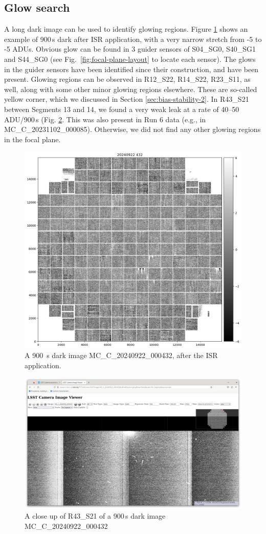 \clearpage
\subsection{Glow search}
A long dark image can be used to identify glowing regions. Figure \ref{fig:glowsearch} shows an example of 900\,s dark after ISR application, with a very narrow stretch from -5 to -5 ADUs. 
Obvious glow can be found in 3 guider sensors of S04\_SG0, S40\_SG1 and S44\_SG0 (see Fig.~\ref{fig:focal-plane-layout} to locate each sensor). The glows in the guider sensors have been identified since their construction, and have been present.
Glowing regions can be observed in R12\_S22, R14\_S22, R23\_S11, as well, along with some other minor glowing regions elsewhere. These are so-called yellow corner, which we discussed in Section \ref{sec:bias-stability-2}.
In R43\_S21 between Segments 13 and 14, we found a very weak leak at a rate of 40--50\,ADU/900\,s (Fig. \ref{fig:glowsearch:closeup}. This was also present in Run 6 data (e.g., in MC\_C\_20231102\_000085).
Otherwise, we did not find any other glowing regions in the focal plane.

\begin{figure}
    \centering
    \includegraphics[width=0.5\linewidth]{figures/glowsearch/900sdark.png}
    \caption{A 900\, s dark image MC\_C\_20240922\_000432, after the ISR application.}
    \label{fig:glowsearch}
\end{figure}
\begin{figure}
    \centering
    \includegraphics[width=1.0\linewidth]{figures/glowsearch/R43S21.png}
    \caption{A close up of R43\_S21 of a 900\,s dark image MC\_C\_20240922\_000432}
    \label{fig:glowsearch:closeup}
\end{figure}

